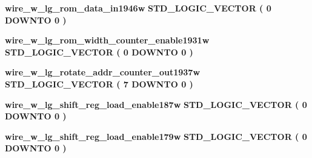 \begin{DoxyCompactItemize}
\item 
{\bf wire\+\_\+w\+\_\+lg\+\_\+rom\+\_\+data\+\_\+in1946w} {\bfseries \textcolor{comment}{S\+T\+D\+\_\+\+L\+O\+G\+I\+C\+\_\+\+V\+E\+C\+T\+OR}\textcolor{vhdlchar}{ }\textcolor{vhdlchar}{(}\textcolor{vhdlchar}{ }\textcolor{vhdlchar}{ } \textcolor{vhdldigit}{0} \textcolor{vhdlchar}{ }\textcolor{keywordflow}{D\+O\+W\+N\+TO}\textcolor{vhdlchar}{ }\textcolor{vhdlchar}{ } \textcolor{vhdldigit}{0} \textcolor{vhdlchar}{ }\textcolor{vhdlchar}{)}\textcolor{vhdlchar}{ }} 
\item 
{\bf wire\+\_\+w\+\_\+lg\+\_\+rom\+\_\+width\+\_\+counter\+\_\+enable1931w} {\bfseries \textcolor{comment}{S\+T\+D\+\_\+\+L\+O\+G\+I\+C\+\_\+\+V\+E\+C\+T\+OR}\textcolor{vhdlchar}{ }\textcolor{vhdlchar}{(}\textcolor{vhdlchar}{ }\textcolor{vhdlchar}{ } \textcolor{vhdldigit}{0} \textcolor{vhdlchar}{ }\textcolor{keywordflow}{D\+O\+W\+N\+TO}\textcolor{vhdlchar}{ }\textcolor{vhdlchar}{ } \textcolor{vhdldigit}{0} \textcolor{vhdlchar}{ }\textcolor{vhdlchar}{)}\textcolor{vhdlchar}{ }} 
\item 
{\bf wire\+\_\+w\+\_\+lg\+\_\+rotate\+\_\+addr\+\_\+counter\+\_\+out1937w} {\bfseries \textcolor{comment}{S\+T\+D\+\_\+\+L\+O\+G\+I\+C\+\_\+\+V\+E\+C\+T\+OR}\textcolor{vhdlchar}{ }\textcolor{vhdlchar}{(}\textcolor{vhdlchar}{ }\textcolor{vhdlchar}{ } \textcolor{vhdldigit}{7} \textcolor{vhdlchar}{ }\textcolor{keywordflow}{D\+O\+W\+N\+TO}\textcolor{vhdlchar}{ }\textcolor{vhdlchar}{ } \textcolor{vhdldigit}{0} \textcolor{vhdlchar}{ }\textcolor{vhdlchar}{)}\textcolor{vhdlchar}{ }} 
\item 
{\bf wire\+\_\+w\+\_\+lg\+\_\+shift\+\_\+reg\+\_\+load\+\_\+enable187w} {\bfseries \textcolor{comment}{S\+T\+D\+\_\+\+L\+O\+G\+I\+C\+\_\+\+V\+E\+C\+T\+OR}\textcolor{vhdlchar}{ }\textcolor{vhdlchar}{(}\textcolor{vhdlchar}{ }\textcolor{vhdlchar}{ } \textcolor{vhdldigit}{0} \textcolor{vhdlchar}{ }\textcolor{keywordflow}{D\+O\+W\+N\+TO}\textcolor{vhdlchar}{ }\textcolor{vhdlchar}{ } \textcolor{vhdldigit}{0} \textcolor{vhdlchar}{ }\textcolor{vhdlchar}{)}\textcolor{vhdlchar}{ }} 
\item 
{\bf wire\+\_\+w\+\_\+lg\+\_\+shift\+\_\+reg\+\_\+load\+\_\+enable179w} {\bfseries \textcolor{comment}{S\+T\+D\+\_\+\+L\+O\+G\+I\+C\+\_\+\+V\+E\+C\+T\+OR}\textcolor{vhdlchar}{ }\textcolor{vhdlchar}{(}\textcolor{vhdlchar}{ }\textcolor{vhdlchar}{ } \textcolor{vhdldigit}{0} \textcolor{vhdlchar}{ }\textcolor{keywordflow}{D\+O\+W\+N\+TO}\textcolor{vhdlchar}{ }\textcolor{vhdlchar}{ } \textcolor{vhdldigit}{0} \textcolor{vhdlchar}{ }\textcolor{vhdlchar}{)}\textcolor{vhdlchar}{ }} 

\end{DoxyCompactItemize}
